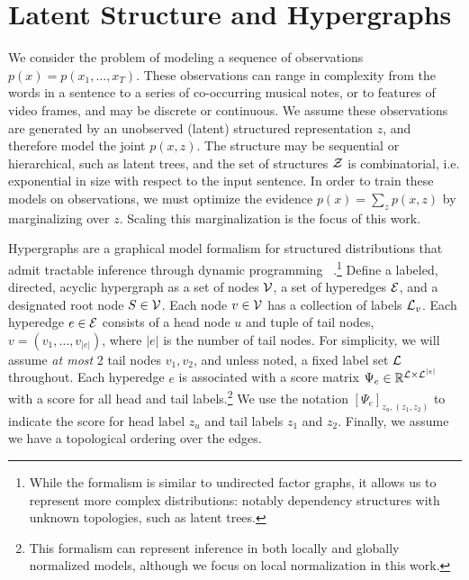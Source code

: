 \documentclass{article}
\begin{document}
\section{Latent Structure and Hypergraphs}

We consider the problem of modeling a sequence of observations $p(x)= p(x_1, \dots, x_T)$.
These observations can range in complexity from the words in a sentence to a series of co-occurring musical notes,
or to features of video frames, and 
may be discrete or continuous.
We assume these observations are generated by an unobserved (latent) structured representation $z$, and therefore model the joint
$p(x, z)$.
The structure may be sequential or hierarchical, such as latent trees,
and the set of structures $\mathcal{Z}$ is combinatorial, i.e. exponential in size with respect to the input sentence. 
In order to train these models on observations, we must optimize the evidence
$p(x) = \sum_z p(x,z)$ by marginalizing over $z$. Scaling this marginalization is the focus of this work. 

Hypergraphs are a graphical model formalism  for structured distributions that admit tractable
inference through dynamic programming~ \citep{klein2004parsing,huang2005better,zhou2006learning,javidian2020hypergraph,chiang2020factor}.\footnote{While the formalism is similar to undirected factor graphs,
it allows us to represent more complex distributions: notably
dependency structures with unknown topologies, such as latent trees.}
Define a labeled, directed, acyclic hypergraph as a set of nodes
$\cal V$, a set of hyperedges $\cal E$, and a designated root node $S \in {\cal V}$. 
Each node $v \in \mathcal{V}$ has a collection of labels ${\cal L}_v$.
Each hyperedge $e\in\mathcal{E}$ consists of a head node $u$ and tuple of tail nodes, $v = (v_1, \ldots, v_{|e|})$, where $|e|$ is the number of tail nodes.
For simplicity, we will assume \textit{at most} 2 tail nodes $v_1, v_2$, and unless noted, a fixed label set $\mathcal{L}$ throughout.
Each hyperedge $e$ is associated with a score matrix $\Psi_e\in\mathbb{R}^{\mathcal{L}\times \mathcal{L}^{|e|}}$ 
with a score for all head and tail labels.\footnote{This formalism can represent inference in both locally and globally normalized models, although we focus on local normalization in this work.}
We use the notation $[\Psi_e]_{z_u,(z_1, z_2)}$ to indicate the score for head label $z_u$ and tail labels $z_1$ and $z_2$.
Finally, we assume we have a topological ordering over the edges.
\end{document}
